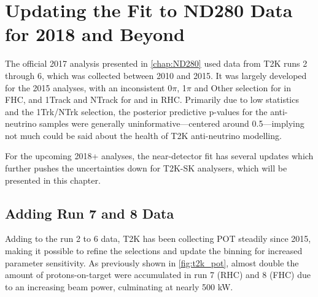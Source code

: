 \chapter{Updating the Fit to ND280 Data for 2018 and Beyond}
\label{chap:nd280_2018}
The official 2017 analysis presented in \autoref{chap:ND280} used data from T2K runs 2 through 6, which was collected between 2010 and 2015. It was largely developed for the 2015 analyses, with an inconsistent 0$\pi$, 1$\pi$ and Other selection for \numu in FHC, and 1Track and NTrack for \numubar and \numu in RHC. Primarily due to low statistics and the 1Trk/NTrk selection, the posterior predictive p-values for the anti-neutrino samples were generally uninformative---centered around 0.5---implying not much could be said about the health of T2K anti-neutrino modelling.

For the upcoming 2018+ analyses, the near-detector fit has several updates which further pushes the uncertainties down for T2K-SK analysers, which will be presented in this chapter.

\section{Adding Run 7 and 8 Data}
Adding to the run 2 to 6 data, T2K has been collecting POT steadily since 2015, making it possible to refine the selections and update the binning for increased parameter sensitivity. As previously shown in \autoref{fig:t2k_pot}, almost double the amount of protons-on-target were accumulated in run 7 (RHC) and 8 (FHC) due to an increasing beam power, culminating at nearly 500 kW.

